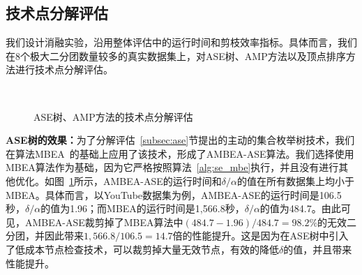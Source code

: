 


\subsection{技术点分解评估}

我们设计消融实验，沿用整体评估中的运行时间和剪枝效率指标。具体而言，我们在8个极大二分团数量较多的真实数据集上，对ASE树、AMP方法以及顶点排序方法进行技术点分解评估。


\begin{figure} [t]
	\centering
  \vspace{0.05in}
  \\
  \vspace{0.05in}
	\caption{ASE树、AMP方法的技术点分解评估}
	\label{fig:ambea_opt}
\end{figure}




\textbf{ASE树的效果：}为了分解评估~\ref{subsec:ase}节提出的主动的集合枚举树技术，我们在算法MBEA~\cite{iMBEA14}的基础上应用了该技术，形成了AMBEA-ASE算法。我们选择使用MBEA算法作为基础，因为它严格按照算法~\ref{alg:se_mbe}执行，并且没有进行其他优化。如图~\ref{fig:ambea_opt}所示，AMBEA-ASE的运行时间和$\delta/\alpha$的值在所有数据集上均小于MBEA。具体而言，以YouTube数据集为例，AMBEA-ASE的运行时间是106.5秒，$\delta/\alpha$的值为1.96；而MBEA的运行时间是1,566.8秒，$\delta/\alpha$的值为484.7。由此可见，AMBEA-ASE裁剪掉了MBEA算法中$(484.7-1.96)/484.7=98.2\%$的无效二分团，并因此带来$1,566.8/106.5=14.7$倍的性能提升。这是因为在ASE树中引入了低成本节点检查技术，可以裁剪掉大量无效节点，有效的降低$\delta$的值，并且带来性能提升。

